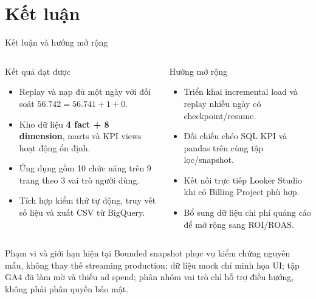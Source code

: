 \documentclass[aspectratio=169]{beamer}
\begin{document}
\section{Kết luận}

\begin{frame}{Kết luận và hướng mở rộng}
  \small
  \begin{columns}[T,onlytextwidth]
    \begin{block}{Kết quả đạt được}
      \scriptsize
      \begin{itemize}
        \item Replay và nạp đủ một ngày với đối soát $56.742=56.741+1+0$.
        \item Kho dữ liệu \textbf{4 fact + 8 dimension}, marts và KPI views hoạt động ổn định.
        \item Ứng dụng gồm 10 chức năng trên 9 trang theo 3 vai trò người dùng.
        \item Tích hợp kiểm thử tự động, truy vết số liệu và xuất CSV từ BigQuery.
      \end{itemize}
    \end{block}
    \begin{exampleblock}{Hướng mở rộng}
      \scriptsize
      \begin{itemize}
        \item Triển khai incremental load và replay nhiều ngày có checkpoint/resume.
        \item Đối chiếu chéo SQL KPI và pandas trên cùng tập lọc/snapshot.
        \item Kết nối trực tiếp Looker Studio khi có Billing Project phù hợp.
        \item Bổ sung dữ liệu chi phí quảng cáo để mở rộng sang ROI/ROAS.
      \end{itemize}
    \end{exampleblock}
  \end{columns}
  \begin{alertblock}{Phạm vi và giới hạn hiện tại}
    \scriptsize
    Bounded snapshot phục vụ kiểm chứng nguyên mẫu, không thay thế streaming production;
    dữ liệu mock chỉ minh họa UI; tập GA4 đã làm mờ và thiếu ad spend; phân nhóm vai trò
    chỉ hỗ trợ điều hướng, không phải phân quyền bảo mật.
  \end{alertblock}
\end{frame}
\end{document}
